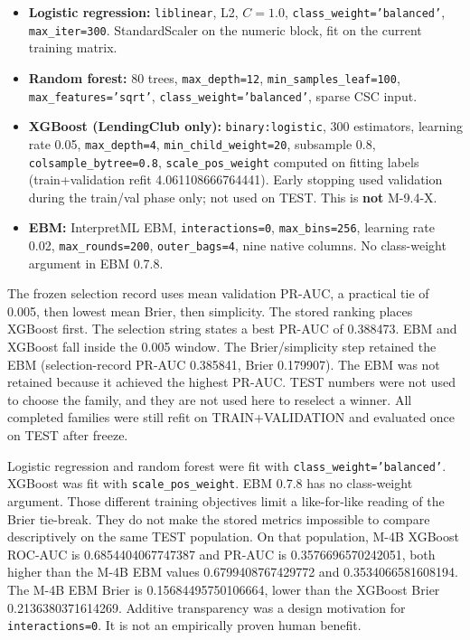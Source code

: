 \documentclass{ieeeaccess}
\begin{document}
\begin{sloppypar}
\begin{itemize}
\item \textbf{Logistic regression:} \texttt{liblinear}, L2, \(C=1.0\), \texttt{class\_weight='balanced'}, \texttt{max\_iter=300}. StandardScaler on the numeric block, fit on the current training matrix.
\item \textbf{Random forest:} 80 trees, \texttt{max\_depth=12}, \texttt{min\_samples\_leaf=100}, \texttt{max\_features='sqrt'}, \texttt{class\_weight='balanced'}, sparse CSC input.
\item \textbf{XGBoost (LendingClub only):} \texttt{binary:logistic}, 300 estimators, learning rate 0.05, \texttt{max\_depth=4}, \texttt{min\_child\_weight=20}, subsample 0.8, \texttt{colsample\_bytree=0.8}, \texttt{scale\_pos\_weight} computed on fitting labels (train+validation refit 4.061108666764441). Early stopping used validation during the train/val phase only; not used on TEST. This is \textbf{not} M-9.4-X.
\item \textbf{EBM:} InterpretML EBM, \texttt{interactions=0}, \texttt{max\_bins=256}, learning rate 0.02, \texttt{max\_rounds=200}, \texttt{outer\_bags=4}, nine native columns. No class-weight argument in EBM 0.7.8.

\end{itemize}
\end{sloppypar}
The frozen selection record uses mean validation PR-AUC, a practical tie of 0.005, then lowest mean Brier, then simplicity. The stored ranking places XGBoost first. The selection string states a best PR-AUC of 0.388473. EBM and XGBoost fall inside the 0.005 window. The Brier/simplicity step retained the EBM (selection-record PR-AUC 0.385841, Brier 0.179907). The EBM was not retained because it achieved the highest PR-AUC. TEST numbers were not used to choose the family, and they are not used here to reselect a winner. All completed families were still refit on TRAIN+VALIDATION and evaluated once on TEST after freeze.

Logistic regression and random forest were fit with \texttt{class\_weight='balanced'}. XGBoost was fit with \texttt{scale\_pos\_weight}. EBM 0.7.8 has no class-weight argument. Those different training objectives limit a like-for-like reading of the Brier tie-break. They do not make the stored metrics impossible to compare descriptively on the same TEST population. On that population, M-4B XGBoost ROC-AUC is 0.6854404067747387 and PR-AUC is 0.3576696570242051, both higher than the M-4B EBM values 0.6799408767429772 and 0.3534066581608194. The M-4B EBM Brier is 0.15684495750106664, lower than the XGBoost Brier 0.2136380371614269. Additive transparency was a design motivation for \texttt{interactions=0}. It is not an empirically proven human benefit.
\end{document}
